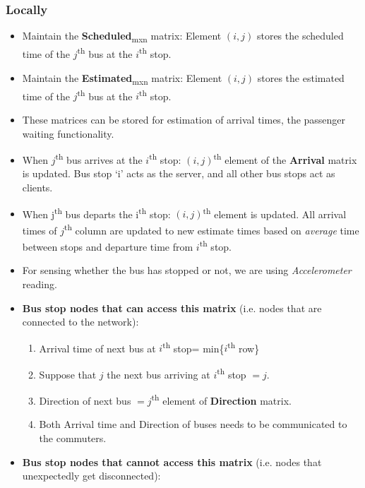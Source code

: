 \subsubsection{Locally}

\begin{itemize}

\item Maintain the \textbf{Scheduled}\textsubscript{mxn} matrix: Element $(i, j)$ stores the scheduled time of the $j$\textsuperscript{th} bus at the $i$\textsuperscript{th} stop.
\item Maintain the \textbf{Estimated}\textsubscript{mxn} matrix: Element $(i, j)$ stores the estimated time of the $j$\textsuperscript{th} bus at the $i$\textsuperscript{th} stop.
\item These matrices can be stored for estimation of arrival times, the passenger waiting functionality.
\item When $j$\textsuperscript{th} bus arrives at the $i$\textsuperscript{th} stop: $(i, j)$\textsuperscript{th} element of the \textbf{Arrival} matrix is updated. Bus stop `i' acts as the server, and all other bus stops act as clients.
\item When j\textsuperscript{th} bus departs the i\textsuperscript{th} stop: $(i, j)$\textsuperscript{th} element is updated. All arrival times of $j$\textsuperscript{th} column are updated to new estimate times based on \textit{average} time between stops and departure time from $i$\textsuperscript{th} stop.
\item For sensing whether the bus has stopped or not, we are using \textit{Accelerometer} reading.
\item \textbf{Bus stop nodes that can access this matrix} (i.e. nodes that are connected to the network):
\begin{enumerate}
\item Arrival time of next bus at $i$\textsuperscript{th} stop= min\{$i$\textsuperscript{th} row\}
\item Suppose that $j$ the next bus arriving at $i$\textsuperscript{th} stop $= j$.
\item Direction of next bus $= j$\textsuperscript{th} element of \textbf{Direction} matrix.
\item Both Arrival time and Direction of buses needs to be communicated to the commuters.
\end{enumerate}
\item \textbf{Bus stop nodes that cannot access this matrix} (i.e. nodes that unexpectedly get disconnected):

\end{itemize}
